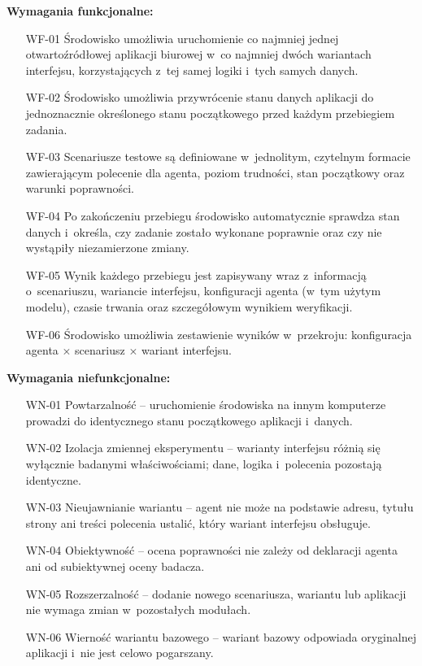 \textbf{Wymagania funkcjonalne:}
\begin{itemize}
    \item[WF-01] Środowisko umożliwia uruchomienie co najmniej jednej otwartoźródłowej aplikacji biurowej w~co najmniej dwóch wariantach interfejsu, korzystających z~tej samej logiki i~tych samych danych.
    \item[WF-02] Środowisko umożliwia przywrócenie stanu danych aplikacji do jednoznacznie określonego stanu początkowego przed każdym przebiegiem zadania.
    \item[WF-03] Scenariusze testowe są definiowane w~jednolitym, czytelnym formacie zawierającym polecenie dla agenta, poziom trudności, stan początkowy oraz warunki poprawności.
    \item[WF-04] Po zakończeniu przebiegu środowisko automatycznie sprawdza stan danych i~określa, czy zadanie zostało wykonane poprawnie oraz czy nie wystąpiły niezamierzone zmiany.
    \item[WF-05] Wynik każdego przebiegu jest zapisywany wraz z~informacją o~scenariuszu, wariancie interfejsu, konfiguracji agenta (w~tym użytym modelu), czasie trwania oraz szczegółowym wynikiem weryfikacji.
    \item[WF-06] Środowisko umożliwia zestawienie wyników w~przekroju: konfiguracja agenta $\times$ scenariusz $\times$ wariant interfejsu.
\end{itemize}

\textbf{Wymagania niefunkcjonalne:}
\begin{itemize}
    \item[WN-01] Powtarzalność -- uruchomienie środowiska na innym komputerze prowadzi do identycznego stanu początkowego aplikacji i~danych.
    \item[WN-02] Izolacja zmiennej eksperymentu -- warianty interfejsu różnią się wyłącznie badanymi właściwościami; dane, logika i~polecenia pozostają identyczne.
    \item[WN-03] Nieujawnianie wariantu -- agent nie może na podstawie adresu, tytułu strony ani treści polecenia ustalić, który wariant interfejsu obsługuje.
    \item[WN-04] Obiektywność -- ocena poprawności nie zależy od deklaracji agenta ani od subiektywnej oceny badacza.
    \item[WN-05] Rozszerzalność -- dodanie nowego scenariusza, wariantu lub aplikacji nie wymaga zmian w~pozostałych modułach.
    \item[WN-06] Wierność wariantu bazowego -- wariant bazowy odpowiada oryginalnej aplikacji i~nie jest celowo pogarszany.
\end{itemize}

